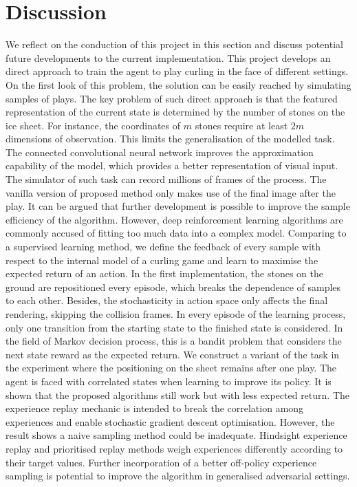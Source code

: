 \documentclass[oneside,11pt,a4paper]{article}
\begin{document}
\section{Discussion}
We reflect on the conduction of this project in this section and discuss potential future developments to the current implementation.
\newline
\newline
\noindent
This project develops an direct approach to train the agent to play curling in the face of different settings. On the first look of this problem, the solution can be easily reached by simulating samples of plays. The key problem of such direct approach is that the featured representation of the current state is determined by the number of stones on the ice sheet. For instance, the coordinates of $m$ stones require at least $2m$ dimensions of observation. This limits the generalisation of the modelled task. The connected convolutional neural network improves the approximation capability of the model, which provides a better representation of visual input. The simulator of such task can record millions of frames of the process. The vanilla version of proposed method only makes use of the final image after the play. It can be argued that further development is possible to improve the sample efficiency of the algorithm. However, deep reinforcement learning algorithms are commonly accused of fitting too much data into a complex model.
\newline
\newline
\noindent
Comparing to a supervised learning method, we define the feedback of every sample with respect to the internal model of a curling game and learn to maximise the expected return of an action. In the first implementation, the stones on the ground are repositioned every episode, which breaks the dependence of samples to each other. Besides, the stochasticity in action space only affects the final rendering, skipping the collision frames. In every episode of the learning process, only one transition from the starting state to the finished state is considered. In the field of Markov decision process, this is a bandit problem that considers the next state reward as the expected return. We construct a variant of the task in the experiment where the positioning on the sheet remains after one play. The agent is faced with correlated states when learning to improve its policy. It is shown that the proposed algorithms still work but with less expected return. The experience replay mechanic is intended to break the correlation among experiences and enable stochastic gradient descent optimisation. However, the result shows a naive sampling method could be inadequate. Hindsight experience replay and prioritised replay methods weigh experiences  differently according to their target values. Further incorporation of a better off-policy experience sampling is potential to improve the algorithm in generalised adversarial settings.
\end{document}
